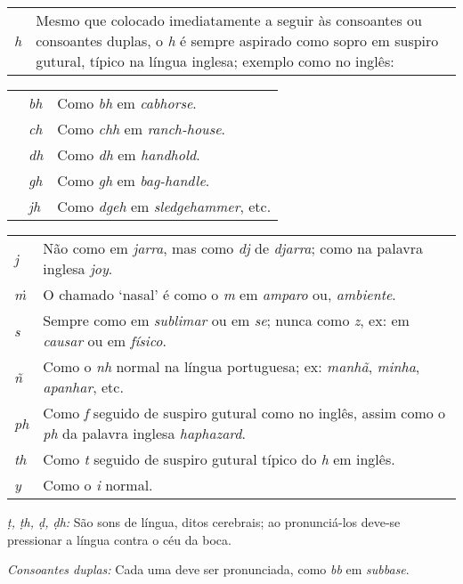 \clearpage

\begin{tabular}{@{} L{5mm} L{\linewidth-5mm}}
\emph{h} & Mesmo que colocado imediatamente a seguir às consoantes ou consoantes duplas, o \emph{h} é sempre aspirado como sopro em suspiro gutural, típico na língua inglesa; exemplo como no inglês:
\end{tabular}

\begin{tabular}{@{} L{5mm} L{5mm} L{\linewidth-10mm}}
& \emph{bh} & Como \emph{bh} em \emph{cabhorse}.\\

& \emph{ch} & Como \emph{chh} em \emph{ranch-house}.\\

& \emph{dh} & Como \emph{dh} em \emph{handhold}.\\

& \emph{gh} & Como \emph{gh} em \emph{bag-handle}.\\

& \emph{jh} & Como \emph{dgeh} em \emph{sledgehammer}, etc.\\
\end{tabular}

\bigskip

\begin{tabular}{@{} L{5mm} L{\linewidth-5mm}}
\emph{j} & Não como em \emph{jarra}, mas como \emph{dj} de \emph{djarra}; como na palavra inglesa \emph{joy}.\\

\emph{ṁ} & O chamado ‘nasal’ é como o \emph{m} em \emph{amparo} ou, \emph{ambiente}.\\

\emph{s} & Sempre como em \emph{sublimar} ou em \emph{se}; nunca como \emph{z}, ex: em \emph{causar} ou em \emph{físico}.\\

\emph{ñ} & Como o \emph{nh} normal na língua portuguesa; ex: \emph{manhã}, \emph{minha}, \emph{apanhar}, etc.\\

\emph{ph} & Como \emph{f} seguido de suspiro gutural como no inglês, assim como o \emph{ph} da palavra inglesa \emph{haphazard}.\\

\emph{th} & Como \emph{t} seguido de suspiro gutural típico do \emph{h} em inglês.\\

\emph{y} & Como o \emph{i} normal.\\
\end{tabular}

\bigskip

\emph{ṭ, ṭh, ḍ, ḍh:} São sons de língua, ditos cerebrais; ao pronunciá-los deve-se pressionar a língua contra o céu da boca.

\emph{Consoantes duplas:} Cada uma deve ser pronunciada, como \emph{bb} em \emph{subbase}.
